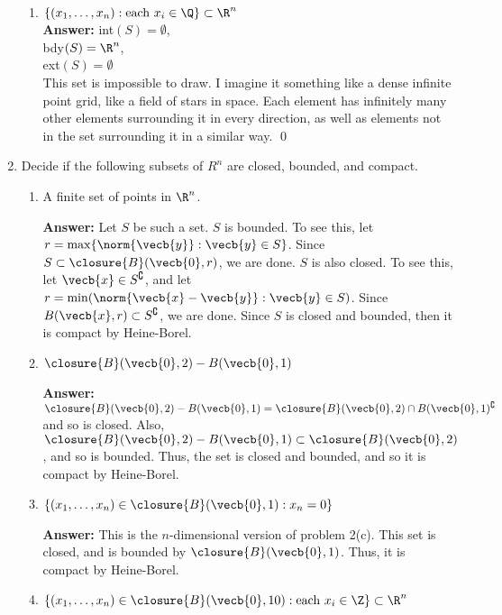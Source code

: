\documentclass[letterpaper]{article}
\begin{document}
\begin{enumerate}
	\begin{enumerate}[label=(\alph*), start=5]
	\item $\{(x_1, \ldots, x_n): \text{each } x_i\in\Q\}\subset \R^n$\\
	\textbf{Answer:} int$(S) = \emptyset$, \\bdy$(S) = \R^n$, \\ext$(S) = \emptyset$\\
	This set is impossible to draw. I imagine it something like a dense infinite point grid, like a field of stars in space. Each element has infinitely many other elements surrounding it in every direction, as well as elements not in the set surrounding it in a similar way. \qed
	\end{enumerate}

\item  Decide if the following subsets of $R^n$ are closed, bounded, and compact.
	\begin{enumerate}[label=(\alph*)]
	\item A finite set of points in $\R^n$.
	
	\textbf{Answer:} Let $S$ be such a set. $S$ is bounded. To see this, let $r=\max\{\norm{\vecb{y}}:\vecb{y}\in S\}$. Since $S\subset \closure{B}(\vecb{0},r)$, we are done. $S$ is also closed. To see this, let $\vecb{x}\in S^\complement$, and let $r=\min(\norm{\vecb{x}-\vecb{y}}:\vecb{y}\in S)$. Since $B(\vecb{x},r)\subset S^\complement$, we are done. Since $S$ is closed and bounded, then it is compact by Heine-Borel.
	
	\item $\closure{B}(\vecb{0},2)-B(\vecb{0},1)$
	
	\textbf{Answer:} $\closure{B}(\vecb{0},2)-B(\vecb{0},1) = \closure{B}(\vecb{0},2)\cap B(\vecb{0},1)^\complement$ and so is closed. Also, $\closure{B}(\vecb{0},2)-B(\vecb{0},1)\subset\closure{B}(\vecb{0},2)$, and so is bounded. Thus, the set is closed and bounded, and so it is compact by Heine-Borel. 
	
	\item $\{(x_1, \ldots, x_n)\in\closure{B}(\vecb{0},1):x_n = 0\}$
	
	\textbf{Answer:} This is the $n$-dimensional version of problem 2(c). This set is closed, and is bounded by $\closure{B}(\vecb{0},1)$. Thus, it is compact by Heine-Borel.
	
	\item $\{(x_1, \ldots, x_n)\in\closure{B}(\vecb{0},10): \text{each }x_i\in \Z\}\subset \R^n$ 
	

\end{enumerate}
\end{enumerate}
\end{document}
